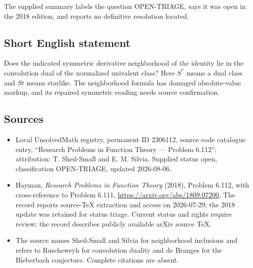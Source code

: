 \documentclass[11pt]{article}
\begin{document}
The supplied summary labels the question OPEN-TRIAGE, says it was open in the 2018 edition, and reports no definitive resolution located.
\subsection{Short English statement}
Does the indicated symmetric derivative neighborhood of the identity lie in the convolution dual of the normalized univalent class? Here $S^*$ means a dual class and $St$ means starlike. The neighborhood formula has damaged absolute-value markup, and its repaired symmetric reading needs source confirmation.
\subsection{Sources}
\begin{itemize}
\item Local UnsolvedMath registry, permanent ID 2306112, source code catalogue entry, ``Research Problems in Function Theory --- Problem 6.112''; attribution: T. Sheil-Small and E. M. Silvia. Supplied status open, classification OPEN-TRIAGE, updated 2026-08-06.
\item Hayman, \emph{Research Problems in Function Theory} (2018), Problem 6.112, with cross-reference to Problem 6.111, \url{https://arxiv.org/abs/1809.07200}. The record reports source-TeX extraction and access on 2026-07-29; the 2018 update was retained for status triage. Current status and rights require review; the record describes publicly available arXiv source TeX.
\item The source names Sheil-Small and Silvia for neighborhood inclusions and refers to Ruscheweyh for convolution duality and de Branges for the Bieberbach conjecture. Complete citations are absent.
\end{itemize}
\end{document}
